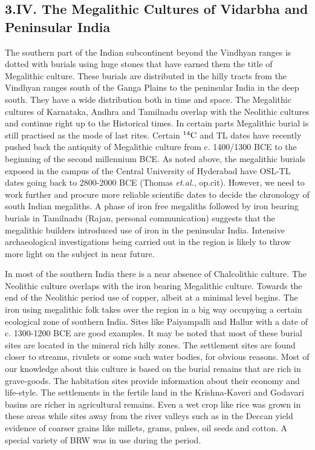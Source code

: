 \subsection*{3.IV. The Megalithic Cultures of Vidarbha and\\ Peninsular India}\label{subsection-11}

The southern part of the Indian subcontinent beyond the Vindhyan ranges is dotted with burials using huge stones that have earned them the title of Megalithic culture. These burials are distributed in the hilly tracts from the Vindhyan ranges south of the Ganga Plains to the peninsular India in the deep south. They have a wide distribution both in time and space. The Megalithic cultures of Karnataka, Andhra and Tamilnadu overlap with the Neolithic cultures and continue right up to the Historical times. In certain parts Megalithic burial is still practised as the mode of last rites. Certain $^{14}{\rm C}$ and TL dates have recently pushed back the antiquity of Megalithic culture from c. 1400/1300 BCE to the beginning of the second millennium BCE. As noted above, the megalithic burials exposed in the campus of the Central University of Hyderabad have OSL-TL dates going back to 2800-2000 BCE (Thomas \textit{et.al.}, op.cit). However, we need to work further and procure more reliable scientific dates to decide the chronology of south Indian megaliths. A phase of iron free megaliths followed by iron bearing burials in Tamilnadu (Rajan, personal communication) suggests that the megalithic builders introduced use of iron in the peninsular India. Intensive archaeological investigations being carried out in the region is likely to throw more light on the subject in near future.

In most of the southern India there is a near absence of Chalcolithic culture. The Neolithic culture overlaps with the iron bearing Megalithic culture. Towards the end of the Neolithic period use of copper, albeit at a minimal level begins. The iron using megalithic folk takes over the region in a big way occupying a certain ecological zone of southern India. Sites like Paiyampalli and Hallur with a date of c. 1300-1200 BCE are good examples. It may be noted that most of these burial sites are located in the mineral rich hilly zones. The settlement sites are found closer to streams, rivulets or some such water bodies, for obvious reasons. Most of our knowledge about this culture is based on the burial remains that are rich in grave-goods. The habitation sites provide information about their economy and life-style. The settlements in the fertile land in the Krishna-Kaveri and Godavari basins are richer in agricultural remains. Even a wet crop like rice was grown in these areas while sites away from the river valleys such as in the Deccan yield evidence of coarser grains like millets, grams, pulses, oil seeds and cotton. A special variety of BRW was in use during the period. 

